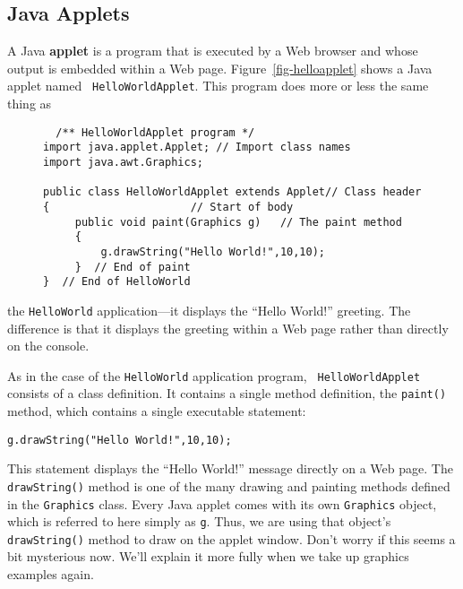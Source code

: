 \subsection{Java Applets}

A Java {\bf applet} is a program that is executed by a Web browser and
whose output is embedded within a Web
page. Figure~\ref{fig-helloapplet} shows a Java applet named {\tt
HelloWorldApplet}. This program does more or less the same thing as
\begin{figure}[h!]
\jjjprogstart
\begin{jjjlisting}
\begin{lstlisting}
  /** HelloWorldApplet program */
import java.applet.Applet; // Import class names
import java.awt.Graphics;

public class HelloWorldApplet extends Applet// Class header
{                      // Start of body
     public void paint(Graphics g)   // The paint method
     {
         g.drawString("Hello World!",10,10);
     }  // End of paint
}  // End of HelloWorld
\end{lstlisting}
\end{jjjlisting}
\end{figure}
the {\tt HelloWorld} application---it displays the ``Hello World!'' 
greeting. The difference is that it displays the greeting within
a Web page rather than directly on the console. 

As in the case of the {\tt HelloWorld} application program, {\tt
Hello\-World\-Applet} consists of a class definition.  It contains a
single method definition, the {\tt paint()} method, which
contains a single executable statement:

\begin{jjjlisting}
\begin{lstlisting}
g.drawString("Hello World!",10,10);
\end{lstlisting}
\end{jjjlisting}

\noindent This statement displays the ``Hello World!'' message directly 
on a Web page. The {\tt drawString()} method is one of the many
drawing and painting methods defined in the {\tt Graphics} class.
Every Java applet comes with its own {\tt Graphics} object, which is
referred to here simply as {\tt g}. Thus, we are using that object's
{\tt drawString()} method to draw on the applet window. Don't worry
if this seems a bit mysterious now. We'll explain it more fully when
we take up graphics examples again.


